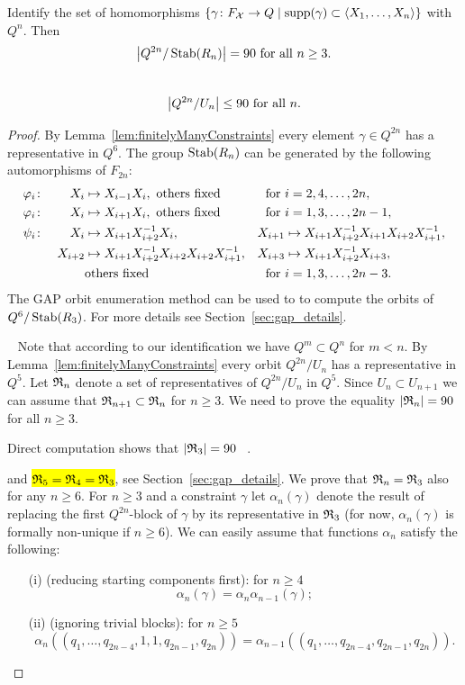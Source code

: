 \documentclass[a4paper,11pt]{amsart}
\newcommand\replaceTh[2]{\st{#1}{\color{DeepPink1}\ #2}}
\newcommand\replace[2]{\st{#1}{\color{Green4}\ #2}}
\newcommand\remove[1]{{\color{Tomato1}#1}}
\begin{document}
\begin{lem}\label{lem:90Constraints}
 Identify the set of homomorphisms $\{\gamma \colon F_{\mathcal{X}} \to Q \mid \operatorname{{supp}}(\gamma) \subset \left<X_1,\ldots, X_n\right>\}$ with $Q^{n}$. 
 Then \remove{\[\left|{Q^{2n}/\operatorname{Stab}(R_n)}\right|=90 \text{ for all } n\geq 3	.\]}
 \replaceTh{}{\[\left|{Q^{2n}/U_n}\right|\leq 90 \text{ for all } n.\]}
\end{lem}
\begin{proof}
\remove{
By Lemma~\ref{lem:finitelyManyConstraints} every element $\gamma\in Q^{2n}$ has a representative in $Q^6$.
 The group $\operatorname{Stab}(R_n)$ can be generated by the 
 following automorphisms of $F_{2n}$:
 \begin{align*}
  \varphi_i&\colon& X_i&\mapsto X_{i-1}X_i, \textup{ others fixed} & \textup{for }&i=2,4,\dotsc,2n , \\
  \varphi_i&\colon&X_i&\mapsto X_{i+1}X_i, \textup{ others fixed} & \textup{for }&i=1,3,\dotsc,2n-1 ,\\
  \psi_i&\colon&X_i&\mapsto X_{i+1}X_{i+2}^{-1}X_i, &X_{i+1}&\mapsto X_{i+1}X_{i+2}^{-1}X_{i+1}X_{i+2}X_{i+1}^{-1},\\  
  &&X_{i+2}&\mapsto X_{i+1}X_{i+2}^{-1}X_{i+2}X_{i+2}X_{i+1}^{-1}, &X_{i+3}&\mapsto X_{i+1}X_{i+2}^{-1}X_{i+3},\\
           &&&\textup{others fixed} & \textup{for }&i=1,3,\dotsc,2n-3 .  
 \end{align*}
 The GAP orbit enumeration method \gapinline{OrbitsDomain} can be used to 
 to compute the orbits of ${Q^6/\operatorname{Stab}(R_3)}$.
 For more details see Section~\ref{sec:gap_details}.}
\replace{}{
\let\al\alpha
\let\ga\gamma
\let\th\theta
Note that according to our identification we have $Q^m \subset Q^n$ for $m < n$.
By Lemma~\ref{lem:finitelyManyConstraints} every orbit $Q^{2n} / U_n$ has a representative in $Q^5$.
Let $\mathfrak{R}_n$ denote a set of representatives of $Q^{2n}/ U_n$ in $Q^5$. 
Since $U_n \subset U_{n+1}$ we can assume that $\mathfrak{R}_{n+1} \subset \mathfrak{R}_n$ for $n \ge 3$.
\remove{We need to prove the equality $|\mathfrak{R}_n| = 90$ for all $n \ge 3$.}

Direct computation shows that $|\mathfrak{R}_3| = 90$ \replaceTh{}{.}
\remove{and \hl{$\mathfrak{R}_5 = \mathfrak{R}_4 = \mathfrak{R}_3$}, \marginnote{\color{blue} Remark 2}
see Section~\ref{sec:gap_details}.
We prove that $\mathfrak{R}_n = \mathfrak{R}_3$ also for any $n \ge 6$. 
\marginnote{\color{pink} Remark 3}
For $n \ge 3$ and a constraint $\ga$ let $\al_n(\ga)$ denote the result of replacing the first $Q^{2n}$-block
of $\ga$ by its representative in $\mathfrak{R}_3$ (for now, $\al_n(\ga)$ is formally non-unique if $n \ge 6$).
We can easily assume that functions $\al_n$ satisfy the following:
\begin{itemize}
\item[(i)] 
(reducing starting components first): for $n\ge 4$ 
$$
  \al_{n}(\ga) = \al_{n}\al_{n-1}(\ga);
$$
\item[(ii)]
(ignoring trivial blocks): for $n\ge 5$ 
$$
  \al_{n}((q_1,\dots,q_{2n-4},1,1,q_{2n-1},q_{2n})) = \al_{n-1}((q_1,\dots,q_{2n-4},q_{2n-1},q_{2n})).
$$
\end{itemize}



}}
\end{proof}
\end{document}
